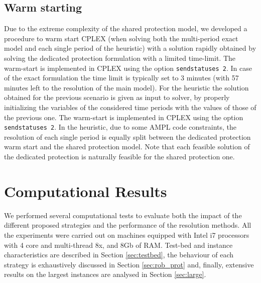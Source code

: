 \documentclass[final,5p,times,twocolumn]{elsarticle}
\begin{document}
\subsection{Warm starting}
Due to the extreme complexity of the shared protection model, we developed a procedure to warm start CPLEX (when solving both the multi-period exact model and each single period of the heuristic) with a solution rapidly obtained by solving the dedicated protection formulation with a limited time-limit. The warm-start is implemented in CPLEX using the option {\tt sendstatuses 2}. In case of the exact formulation the time limit is typically set to 3 minutes (with 57 minutes left to the resolution of the main model). For the heuristic the solution obtained for the previous scenario is given as input to solver, by properly initializing the variables of the considered time periods with the values of those of the previous one. The warm-start is implemented in CPLEX using the option {\tt sendstatuses 2}. In the heuristic, due to some AMPL code constraints, the resolution of each single period is equally split between the dedicated protection warm start and the shared protection model. Note that each feasible solution of the dedicated protection is naturally feasible for the shared protection one. 




\section{Computational Results}\label{sec:results}
We performed several computational tests to evaluate both the impact of the different proposed strategies and the performance of the resolution methods. All the experiments were carried out on machines equipped with Intel i7 processors with 4 core and multi-thread 8x, and 8Gb of RAM. Test-bed and instance characteristics are described in Section \ref{sec:testbed}, the behaviour of each strategy is exhaustively discussed in Section \ref{sec:rob_prot} and, finally, extensive results on the largest instances are analysed in Section \ref{sec:large}.

\renewcommand\arraystretch{1.1}
\end{document}

